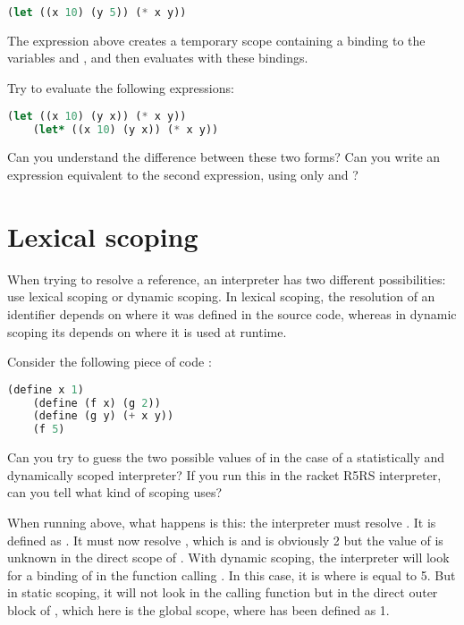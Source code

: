 \documentclass{../../../tp}
\begin{document}
	\begin{lstlisting}[language=lisp]
	(let ((x 10) (y 5)) (* x y))
	\end{lstlisting}

The expression above creates a temporary scope containing a binding to the variables  and , and then evaluates  with these bindings.

\begin{instruction}
	
	Try to evaluate the following expressions:
	
	\begin{lstlisting}[language=lisp]
	(let ((x 10) (y x)) (* x y))
	(let* ((x 10) (y x)) (* x y))
	\end{lstlisting}
	
	Can you understand the difference between these two forms? Can you write an expression equivalent to the second expression, using only  and ?  
	
\end{instruction}


\section{Lexical scoping}

When trying to resolve a reference, an interpreter has two different possibilities: use lexical scoping or dynamic scoping. In lexical scoping, the resolution of an identifier depends on where it was defined in the source code, whereas in dynamic scoping its depends on where it is used at runtime.

\begin{instruction}
	Consider the following piece of code :
	\begin{lstlisting}[language=lisp]
	(define x 1)
	(define (f x) (g 2))
	(define (g y) (+ x y))
	(f 5)   
	\end{lstlisting}
	
	Can you try to guess the two possible values of  in the case of a statistically and dynamically scoped interpreter? If you run this in the racket R5RS interpreter, can you tell what kind of scoping \scheme uses?
	
\end{instruction}

When running  above, what happens is this: the interpreter must resolve . It is defined as . It must now resolve , which is  and  is obviously 2 but the value of  is unknown in the direct scope of . With dynamic scoping, the interpreter will look for a binding of  in the function calling . In this case, it is  where  is equal to 5. But in static scoping, it will not look in the calling function but in the direct outer block of , which here is the global scope, where  has been defined as 1.
\end{document}
